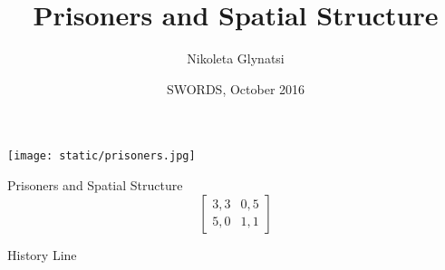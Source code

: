 \documentclass{beamer}
\title{Prisoners and Spatial Structure}
\author{Nikoleta Glynatsi}
\date{SWORDS, October 2016}
\institute[]
{
\begin{center}
    \texttt{[image: static/cardiff\_uni\_logo.jpg]}
\end{center}}
\begin{document}
\frame{\titlepage}

\begin{frame}
\begin{center}
    \texttt{[image: static/prisoners.jpg]}
\end{center}
\end{frame}


\begin{frame}{Prisoners and Spatial Structure}
 \Huge
 \[
\begin{bmatrix}
   3,3 & 0,5  \\
   5,0 & 1,1
\end{bmatrix}
\]
\end{frame}

\begin{frame}{History Line}
\def\labellist{{" ","(1980)","(1991)","(1992)","(2012)"," ","(2015)"," "}}
\end{frame}
\end{document}
